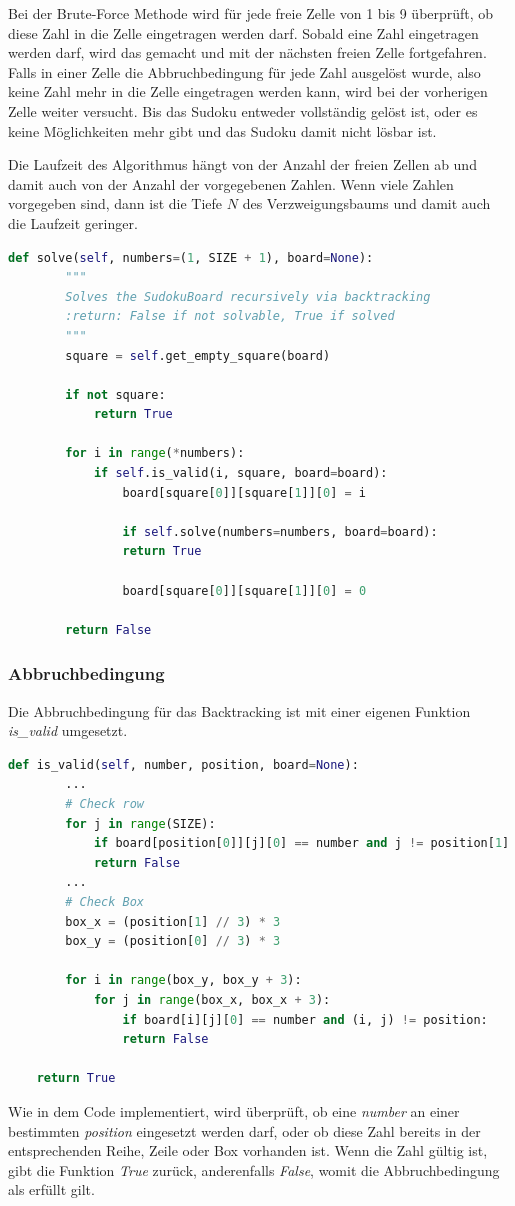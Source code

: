 Bei der Brute-Force Methode wird für jede freie Zelle von 1 bis 9 überprüft, ob diese Zahl in die Zelle eingetragen werden darf. Sobald eine Zahl eingetragen werden darf, wird das gemacht und mit der nächsten freien Zelle fortgefahren. Falls in einer Zelle die Abbruchbedingung für jede Zahl ausgelöst wurde, also keine Zahl mehr in die Zelle eingetragen werden kann, wird bei der vorherigen Zelle weiter versucht. Bis das Sudoku entweder vollständig gelöst ist, oder es keine Möglichkeiten mehr gibt und das Sudoku damit nicht lösbar ist.

Die Laufzeit des Algorithmus hängt von der Anzahl der freien Zellen ab und damit auch von der Anzahl der vorgegebenen Zahlen. Wenn viele Zahlen vorgegeben sind, dann ist die Tiefe $N$ des Verzweigungsbaums und damit auch die Laufzeit geringer. 



\begin{lstlisting}[language=Python, caption={Funktion zum Lösen des Sudoku Rätsel}, label={lst:solve}]
	def solve(self, numbers=(1, SIZE + 1), board=None):
		"""
		Solves the SudokuBoard recursively via backtracking
		:return: False if not solvable, True if solved
		"""
		square = self.get_empty_square(board)
		
		if not square:
			return True
		
		for i in range(*numbers):
			if self.is_valid(i, square, board=board):
				board[square[0]][square[1]][0] = i
		
				if self.solve(numbers=numbers, board=board):
				return True
		
				board[square[0]][square[1]][0] = 0
		
		return False
\end{lstlisting}

\subsubsection{Abbruchbedingung}
Die Abbruchbedingung für das Backtracking ist mit einer eigenen Funktion \textit{is\_valid} umgesetzt.
\begin{lstlisting}[language=Python, caption={Abbruchbedingung durch Validierung der Lösungsvariante}, label={lst:valid}]
	def is_valid(self, number, position, board=None):
		...
		# Check row
		for j in range(SIZE):
			if board[position[0]][j][0] == number and j != position[1]:
			return False
		...
		# Check Box
		box_x = (position[1] // 3) * 3
		box_y = (position[0] // 3) * 3
		
		for i in range(box_y, box_y + 3):
			for j in range(box_x, box_x + 3):
				if board[i][j][0] == number and (i, j) != position:
				return False
		
	return True
\end{lstlisting}
Wie in dem Code implementiert, wird überprüft, ob eine \textit{number} an einer bestimmten \textit{position} eingesetzt werden darf, oder ob diese Zahl bereits in der entsprechenden Reihe, Zeile oder Box vorhanden ist. Wenn die Zahl gültig ist, gibt die Funktion \textit{True} zurück, anderenfalls \textit{False}, womit die Abbruchbedingung als erfüllt gilt. \cite{knott_2017} 

